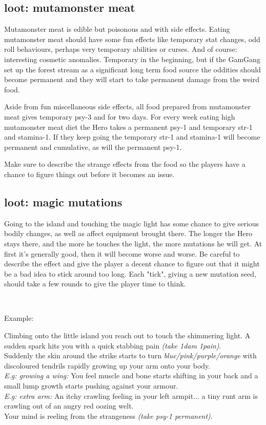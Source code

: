 \subsection*{loot: mutamonster meat}
Mutamonster meat is edible but poisonous and with side effects. Eating mutamonster meat should have some fun effects like temporary stat changes, odd roll behaviours, perhaps very temporary abilities or curses. And of course: interesting cosmetic anomalies. Temporary in the beginning, but if the GamGang set up the forest stream as a significant long term food source the oddities should become permanent and they will start to take permanent damage from the weird food.

Aside from fun miscellaneous side effects, all food prepared from mutamonster meat gives temporary psy-3 and for two days. For every week eating high mutamonster meat diet the Hero takes a permanent psy-1 and temporary str-1 and stamina-1. If they keep going the temporary str-1 and stamina-1 will become permanent and cumulative, as will the permanent psy-1.

Make sure to describe the strange effects from the food so the players have a chance to figure things out before it becomes an issue.


\subsection*{loot: magic mutations}
Going to the island and touching the magic light has some chance to give serious bodily changes, as well as affect equipment brought there. The longer the Hero stays there, and the more he touches the light, the more mutations he will get. At first it's generally good, then it will become worse and worse. Be careful to describe the effect and give the player a decent chance to figure out that it might be a bad idea to stick around too long. Each "tick", giving a new mutation seed, should take a few rounds to give the player time to think.

\

\noindent Example:
\begin{readoutloud}
Climbing onto the little island you reach out to touch the shimmering light. A sudden spark hits you with a quick stabbing pain \emph{(take 1dam 1pain)}.\\
Suddenly the skin around the strike starts to turn \emph{blue/pink/purple/orange} with discoloured tendrils rapidly growing up your arm onto your body.\\
\emph{E.g: growing a wing:} You feel muscle and bone starts shifting in your back and a small lump growth starts pushing against your armour.\\
\emph{E.g: extra arm:} An itchy crawling feeling in your left armpit... a tiny runt arm is crawling out of an angry red oozing welt.\\
Your mind is reeling from the strangeness \emph{(take psy-1 permanent)}.
\end{readoutloud}

